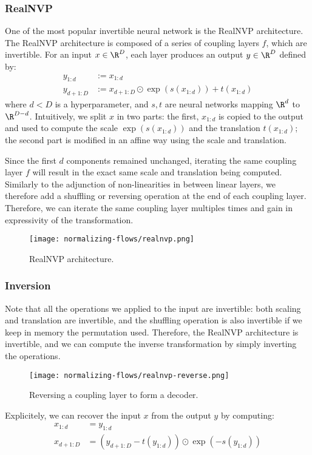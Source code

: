 \subsubsection{RealNVP}
One of the most popular invertible neural network is the RealNVP architecture. The RealNVP architecture is composed of a series of coupling layers $f$, which are invertible. For an input $x\in\R^D$, each layer produces an output $y\in\R^D$ defined by:
\begin{equation*}
    \begin{aligned}
        y_{1:d} &:= x_{1:d}\\
        y_{d+1:D} &:= x_{d+1:D} \odot\exp(s(x_{1:d})) + t(x_{1:d})
    \end{aligned}
\end{equation*}
where $d<D$ is a hyperparameter, and $s, t$ are neural networks mapping $\R^d$ to $\R^{D-d}$. Intuitively, we split $x$ in two parts: the first, $x_{1:d}$ is copied to the output and used to compute the scale $\exp(s(x_{1:d}))$ and the translation $t(x_{1:d})$; the second part is modified in an affine way using the scale and translation.

Since the first $d$ components remained unchanged, iterating the same coupling layer $f$ will result in the exact same scale and translation being computed. Similarly to the adjunction of non-linearities in between linear layers, we therefore add a shuffling or reversing operation at the end of each coupling layer. Therefore, we can iterate the same coupling layer multiples times and gain in expressivity of the transformation.
\begin{figure}[H]
    \centering
    \texttt{[image: normalizing-flows/realnvp.png]}
    \caption{RealNVP architecture.}
\end{figure}

\subsubsection{Inversion}
Note that all the operations we applied to the input are invertible: both scaling and translation are invertible, and the shuffling operation is also invertible if we keep in memory the permutation used. Therefore, the RealNVP architecture is invertible, and we can compute the inverse transformation by simply inverting the operations.
\begin{figure}[H]
    \centering
    \texttt{[image: normalizing-flows/realnvp-reverse.png]}
    \caption{Reversing a coupling layer to form a decoder.}
\end{figure}
Explicitely, we can recover the input $x$ from the output $y$ by computing:
\begin{equation*}
    \begin{aligned}
        x_{1:d} &= y_{1:d}\\
        x_{d+1:D} &= (y_{d+1:D}-t(y_{1:d})) \odot \exp(-s(y_{1:d}))
    \end{aligned}
\end{equation*}

